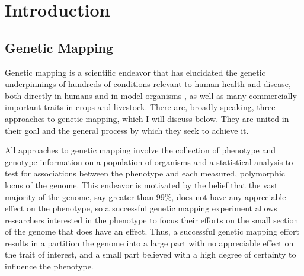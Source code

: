 \chapter{Introduction}

\section{Genetic Mapping}

Genetic mapping is a scientific endeavor that has elucidated the genetic underpinnings of hundreds of conditions relevant to human health and disease, both directly in humans \citep{MacArthur2017} and in model organisms \citep{Grubb2014a}, as well as many commercially-important traits in crops and livestock.
There are, broadly speaking, three approaches to genetic mapping, which I will discuss below.
They are united in their goal and the general process by which they seek to achieve it.

All approaches to genetic mapping involve the collection of phenotype and genotype information on a population of organisms and a statistical analysis to test for associations between the phenotype and each measured, polymorphic locus of the genome.
This endeavor is motivated by the belief that the vast majority of the genome, say greater than 99\%, does not have any appreciable effect on the phenotype, so a successful genetic mapping experiment allows researchers interested in the phenotype to focus their efforts on the small section of the genome that does have an effect.
Thus, a successful genetic mapping effort results in a partition the genome into a large part with no appreciable effect on the trait of interest, and a small part believed with a high degree of certainty to influence the phenotype.

